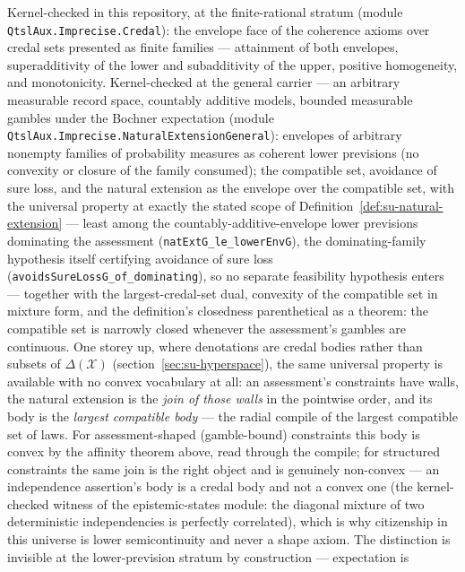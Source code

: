 \begin{remark}
\label{rem:su-envelope-theorem}
Kernel-checked in this repository, at the finite-rational stratum
(module \texttt{QtslAux.Imprecise.Credal}): the envelope face of the
coherence axioms over credal sets presented as finite families ---
attainment of both envelopes, superadditivity of the lower and
subadditivity of the upper, positive homogeneity, and monotonicity.
Kernel-checked at the general carrier --- an arbitrary measurable
record space, countably additive models, bounded measurable gambles
under the Bochner expectation (module
\texttt{QtslAux.Imprecise.NaturalExtensionGeneral}): envelopes of
arbitrary nonempty families of probability measures as coherent
lower previsions (no convexity or closure of the family consumed);
the compatible set, avoidance of sure loss, and the natural
extension as the envelope over the compatible set, with the
universal property at exactly the stated scope of
Definition~\ref{def:su-natural-extension} --- least among the
countably-additive-envelope lower previsions dominating the
assessment (\texttt{natExtG\_le\_lowerEnvG}), the dominating-family
hypothesis itself certifying avoidance of sure loss
(\texttt{avoidsSureLossG\_of\_dominating}), so no separate
feasibility hypothesis enters --- together with the
largest-credal-set dual, convexity of the compatible set in mixture
form, and the definition's closedness parenthetical as a theorem:
the compatible set is narrowly closed whenever the assessment's
gambles are continuous. One storey up, where denotations are credal
bodies rather than subsets of $\Delta(\mathcal{X})$
(section~\ref{sec:su-hyperspace}), the same universal property is
available with no convex vocabulary at all: an assessment's
constraints have walls, the natural extension is the \emph{join of
those walls} in the pointwise order, and its body is the
\emph{largest compatible body} --- the radial compile of the largest
compatible set of laws. For assessment-shaped (gamble-bound)
constraints this body is convex by the affinity theorem above, read
through the compile; for structured constraints the same join is the
right object and is genuinely non-convex --- an independence
assertion's body is a credal body and not a convex one (the
kernel-checked witness of the epistemic-states module: the diagonal
mixture of two deterministic independencies is perfectly
correlated), which is why citizenship in this universe is lower
semicontinuity and never a shape axiom. The distinction is invisible
at the lower-prevision stratum by construction --- expectation is

\end{remark}
